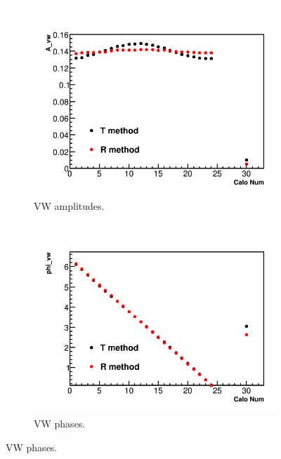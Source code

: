 \documentclass[12pt,letterpaper]{article}
\begin{document}
\begin{figure}[]
\centering
    \begin{subfigure}[t]{0.45\textwidth}
        \centering
        \includegraphics[width=\textwidth]{JamesMC_Avw_Compared}
        \caption{VW amplitudes.}
    \end{subfigure}%
    \hspace{5mm}
    \begin{subfigure}[t]{0.45\textwidth}
        \centering
        \includegraphics[width=\textwidth]{JamesMC_Phivw_Compared}
        \caption{VW phases.}
    \end{subfigure}


\end{figure}
\end{document}
